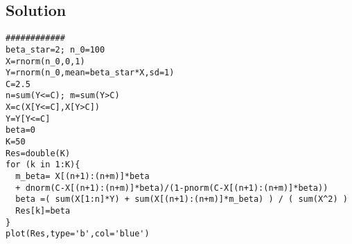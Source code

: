 \documentclass[12pt]{article}
\begin{document}
\subsection*{Solution}

\begin{verbatim}
############
beta_star=2; n_0=100
X=rnorm(n_0,0,1)
Y=rnorm(n_0,mean=beta_star*X,sd=1)
C=2.5
n=sum(Y<=C); m=sum(Y>C)
X=c(X[Y<=C],X[Y>C])
Y=Y[Y<=C]
beta=0
K=50
Res=double(K)
for (k in 1:K){
  m_beta= X[(n+1):(n+m)]*beta 
  + dnorm(C-X[(n+1):(n+m)]*beta)/(1-pnorm(C-X[(n+1):(n+m)]*beta))
  beta =( sum(X[1:n]*Y) + sum(X[(n+1):(n+m)]*m_beta) ) / ( sum(X^2) )
  Res[k]=beta
}
plot(Res,type='b',col='blue')

\end{verbatim}
\end{document}
